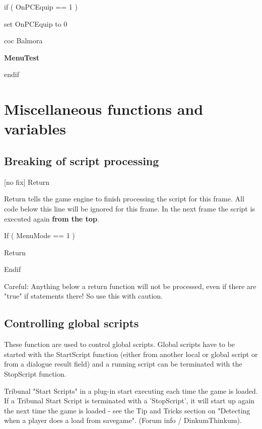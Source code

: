 if ( OnPCEquip == 1 )

set OnPCEquip to 0

coc Balmora

\textbf{MenuTest}

endif

\hypertarget{miscellaneous-functions-and-variables}{%
\section{\texorpdfstring{\hfill\break
Miscellaneous functions and
variables}{ Miscellaneous functions and variables}}\label{miscellaneous-functions-and-variables}}

\hypertarget{breaking-of-script-processing}{%
\subsection{Breaking of script
processing}\label{breaking-of-script-processing}}

{[}no fix{]} Return

Return tells the game engine to finish processing the script for this
frame. All code below this line will be ignored for this frame. In the
next frame the script is executed again \textbf{from the top}.

If ( MenuMode == 1 )

Return

Endif

Careful: Anything below a return function will not be processed, even if
there are "true" if statements there! So use this with caution.

\hypertarget{controlling-global-scripts}{%
\subsection{Controlling global
scripts}\label{controlling-global-scripts}}

These function are used to control global scripts. Global scripts have
to be started with the StartScript function (either from another local
or global script or from a dialogue result field) and a running script
can be terminated with the StopScript function.

Tribunal "Start Scripts" in a plug-in start executing each time the game
is loaded. If a Tribunal Start Script is terminated with a 'StopScript',
it will start up again the next time the game is loaded - see the Tip
and Tricks section on "Detecting when a player does a load from
savegame". (Forum info / DinkumThinkum).


